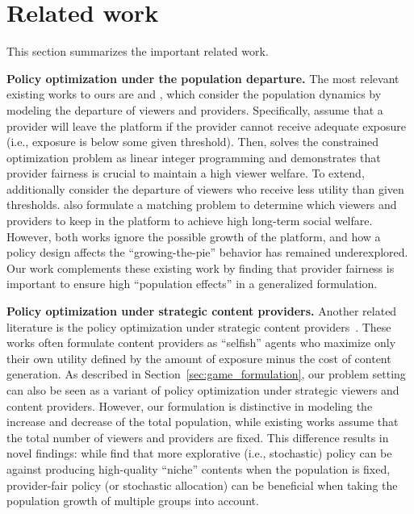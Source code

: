 \section{Related work}
\label{app:related_work}

This section summarizes the important related work.

\textbf{Policy optimization under the population departure.} \quad The most relevant existing works to ours are \citet{mladenov2020optimizing} and \citet{huttenlocher2023matching}, which consider the population dynamics by modeling the departure of viewers and providers. Specifically, \citet{mladenov2020optimizing} assume that a provider will leave the platform if the provider cannot receive adequate exposure (i.e., exposure is below some given threshold). Then, \citet{mladenov2020optimizing} solves the constrained optimization problem as linear integer programming and demonstrates that provider fairness is crucial to maintain a high viewer welfare. To extend, \citet{huttenlocher2023matching} additionally consider the departure of viewers who receive less utility than given thresholds. \citet{huttenlocher2023matching} also formulate a matching problem to determine which viewers and providers to keep in the platform to achieve high long-term social welfare. However, both works ignore the possible growth of the platform, and how a policy design affects the ``growing-the-pie'' behavior has remained underexplored. Our work complements these existing work by finding that provider fairness is important to ensure high ``population effects'' in a generalized formulation.

\textbf{Policy optimization under strategic content providers.} \quad
Another related literature is the policy optimization under strategic content providers~\citep{hron2022modeling, jagadeesan2022supply,  yao2023rethinking}. These works often formulate content providers as ``selfish'' agents who maximize only their own utility defined by the amount of exposure minus the cost of content generation. As described in Section~\ref{sec:game_formulation}, our problem setting can also be seen as a variant of policy optimization under strategic viewers and content providers. However, our formulation is distinctive in modeling the increase and decrease of the total population, while existing works assume that the total number of viewers and providers are fixed. This difference results in novel findings: while \citet{hron2022modeling} find that more explorative (i.e., stochastic) policy can be against producing high-quality ``niche'' contents when the population is fixed, provider-fair policy (or stochastic allocation) can be beneficial when taking the population growth of multiple groups into account.

